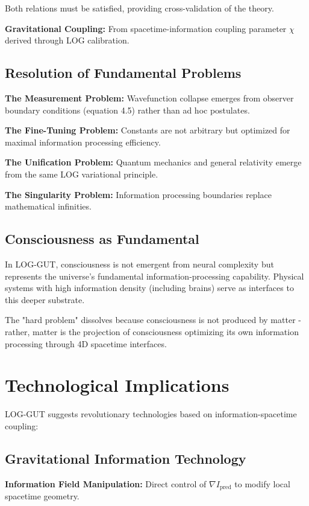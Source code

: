\documentclass[12pt]{article}
\begin{document}
Both relations must be satisfied, providing cross-validation of the theory.

\textbf{Gravitational Coupling:} From spacetime-information coupling parameter $\chi$ derived through LOG calibration.

\subsection{Resolution of Fundamental Problems}

\textbf{The Measurement Problem:} Wavefunction collapse emerges from observer boundary conditions (equation 4.5) rather than ad hoc postulates.

\textbf{The Fine-Tuning Problem:} Constants are not arbitrary but optimized for maximal information processing efficiency.

\textbf{The Unification Problem:} Quantum mechanics and general relativity emerge from the same LOG variational principle.

\textbf{The Singularity Problem:} Information processing boundaries replace mathematical infinities.

\subsection{Consciousness as Fundamental}

In LOG-GUT, consciousness is not emergent from neural complexity but represents the universe's fundamental information-processing capability. Physical systems with high information density (including brains) serve as interfaces to this deeper substrate.

The "hard problem" dissolves because consciousness is not produced by matter - rather, matter is the projection of consciousness optimizing its own information processing through 4D spacetime interfaces.

\section{Technological Implications}

LOG-GUT suggests revolutionary technologies based on information-spacetime coupling:

\subsection{Gravitational Information Technology}

\textbf{Information Field Manipulation:} Direct control of $\nabla I_{\mathrm{pred}}$ to modify local spacetime geometry.
\end{document}
